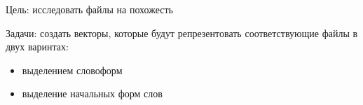 
Цель: исследовать файлы на похожесть

Задачи: создать векторы, которые будут репрезентовать соответствующие файлы в двух варинтах:
\begin{itemize}
    \item выделением словоформ
    \item выделение начальных форм слов
\end{itemize}

\clearpage
